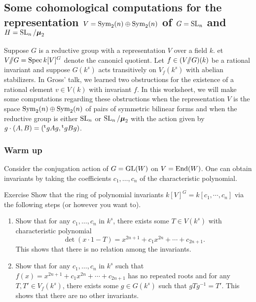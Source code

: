 \subsection{Some cohomological computations for the representation \texorpdfstring{$V=\operatorname{Sym}_2(n)\oplus \operatorname{Sym}_2(n)$}{V=Sym2(n)+Sym2(n)} of \texorpdfstring{$G=\operatorname{SL}_n$}{G=SLn} and \texorpdfstring{$H=\operatorname{SL}_n/\boldsymbol\mu_2$}{H=SL2/mu2}}

Suppose $G$ is a reductive group with a representation $V$ over a field $k$. 
et $V/\!\!/ G=\operatorname{Spec} k[V]^G$ denote the canonicl quotient. Let 
$f\in (V/\!\!/ G)(k)$ be a rational invariant and suppose $G(k^s)$ acts 
transitively on $V_f(k^s)$ with abelian stabilizers. In Gross' talk, we 
learned two obstructions for the existence of a rational element $v\in V(k)$ 
with invariant $f$. In this worksheet, we will make some computations regarding 
these obstructions when the representation $V$ is the space 
$\operatorname{Sym}_2(n)\oplus\operatorname{Sym}_2(n)$ of pairs of symmetric bilinear forms and 
when the reductive group is either $\operatorname{SL}_n$ or 
$\operatorname{SL}_n/\boldsymbol\mu_2$ with the action given by 
$g\cdot (A,B)=(\prescript{\mathrm{t}}{}{g} A g, \prescript{\mathrm{t}}{}{g} B g)$. 


\subsubsection{Warm up}

Consider the conjugation action of $G=\operatorname{GL}(W)$ on $V=\operatorname{End}(W)$. One 
can obtain invariants by taking the coefficients $c_1,\dots,c_n$ of the 
characteristic polynomial. 

\begin{enonce*}[remark]{Exercise}
Show that the ring of polynomial invariants $k[V]^G=k[c_1,\cdots,c_n]$ via the 
following steps (or however you want to). 
\begin{enumerate}
  \item Show that for any $c_1,\dots,c_n$ in $k^s$, there exists some 
    $T\in V(k^s)$ with characteristic polynomial 
    \[
      \det(x\cdot 1-T) = x^{2n+1} + c_1 x^{2n} + \cdots + c_{2n+1} .
    \]
    This shows that there is no relation among the invariants. 
  \item Show that for any $c_1,\dots,c_n$ in $k^s$ such that 
    $f(x)=x^{2n+1} + c_1 x^{2n} + \cdots + c_{2n+1}$ has no repeated roots and 
    for any $T,T'\in V_f(k^s)$, there exists some $g\in G(k^s)$ such that 
    $g T g^{-1} = T'$. This shows that there are no other invariants. 
\end{enumerate}
\end{enonce*}

